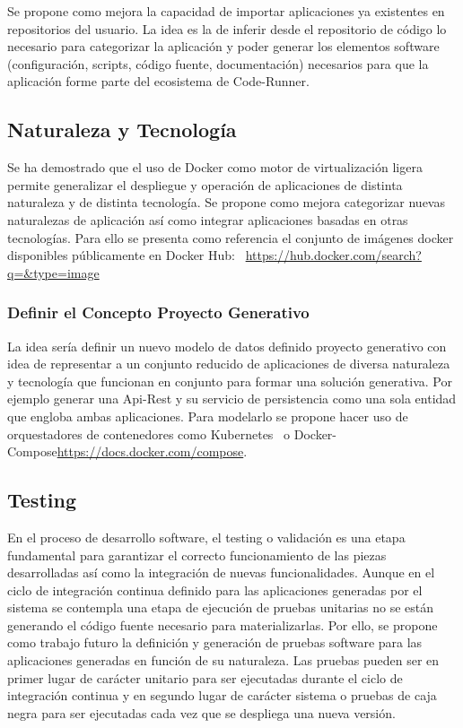 \documentclass[a4paper,11pt]{book}
\begin{document}
Se propone como mejora la capacidad de importar aplicaciones ya existentes en repositorios del usuario. La idea es la de inferir desde el repositorio de código lo necesario para categorizar la aplicación y  poder generar los elementos software (configuración, scripts, código fuente, documentación) necesarios para que la aplicación forme parte del ecosistema de Code-Runner.  

\subsection{Naturaleza y Tecnología}

Se ha demostrado que el  uso de Docker como motor de virtualización ligera permite generalizar el despliegue y operación de aplicaciones de distinta naturaleza y de distinta tecnología. Se propone como mejora categorizar nuevas naturalezas de aplicación así como integrar aplicaciones basadas en otras tecnologías. Para ello se presenta como referencia el conjunto de imágenes docker disponibles públicamente en Docker Hub:~\cite{dhub}   \url{https://hub.docker.com/search?q=&type=image}

\subsubsection{Definir el Concepto Proyecto Generativo}

La idea sería definir un nuevo modelo de datos definido proyecto generativo con idea de representar a un conjunto reducido de aplicaciones de diversa naturaleza y tecnología que funcionan en conjunto para formar una solución generativa. Por ejemplo generar una Api-Rest y su servicio de persistencia como una sola entidad que engloba ambas aplicaciones. Para modelarlo se propone hacer uso de orquestadores de contenedores como Kubernetes~\cite{kube} o Docker-Compose\url{https://docs.docker.com/compose}.  

\subsection{Testing}

 En el proceso de desarrollo software, el testing o validación es una etapa fundamental para garantizar el correcto funcionamiento de las piezas desarrolladas así como la integración de nuevas funcionalidades. Aunque en el ciclo de integración continua definido para las aplicaciones generadas por el sistema se contempla una etapa de ejecución de pruebas unitarias no se están generando el código fuente necesario para materializarlas. Por ello, se propone como trabajo futuro la definición y generación de pruebas software para las aplicaciones generadas en función de su naturaleza. Las pruebas pueden ser en primer lugar de carácter unitario para ser ejecutadas durante el ciclo de integración continua y en segundo lugar de carácter sistema o pruebas de caja negra para ser ejecutadas cada vez que se despliega una nueva versión. 
\end{document}
